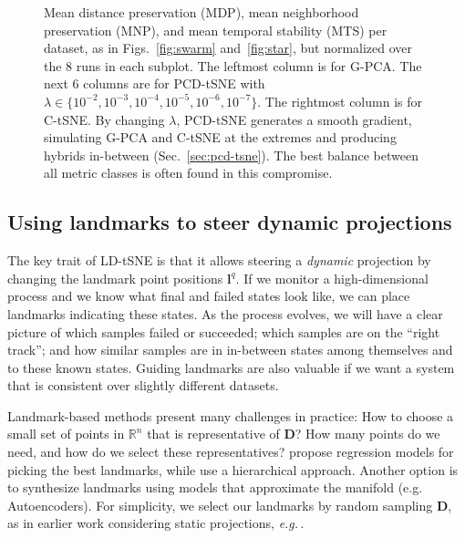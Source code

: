 \begin{figure}[htb!]
 \caption{
Mean distance preservation (MDP), mean neighborhood preservation (MNP), and mean temporal stability (MTS) per dataset, as in Figs.~\ref{fig:swarm} and~\ref{fig:star}, but normalized over the 8 runs in each subplot.
  The leftmost column is for G-PCA. The next 6 columns are for PCD-tSNE with $\lambda \in \{10^{-2}, 10^{-3}, 10^{-4}, 10^{-5}, 10^{-6}, 10^{-7}\}$. The rightmost column is for C-tSNE.
  By changing $\lambda$, PCD-tSNE generates a smooth gradient, simulating G-PCA and C-tSNE at the extremes and producing hybrids in-between (Sec.~\ref{sec:pcd-tsne}). The best balance between all metric classes is often found in this compromise.}
  \vspace{-0.5cm}
 \label{fig:lambda}
\end{figure}



\subsection{Using landmarks to steer dynamic projections} 
\label{sec:landmark-placement}
%
The key trait of LD-tSNE is that it allows steering a \emph{dynamic} projection by changing the landmark point positions $\mathbf{l}^q$. If we monitor a high-dimensional process and we know what final and failed states look like, we can place landmarks indicating these states. As the process evolves, we will have a clear picture of which samples failed or succeeded; which samples are on the ``right track''; and how similar samples are in in-between states among themselves and to these known states. Guiding landmarks are also valuable if we want a system that is consistent over slightly different datasets. 

Landmark-based methods present many challenges in practice: How to choose a small set of points in $\mathbb{R}^n$ that is representative of $\mathbf{D}$? How many points do we need, and how do we select these representatives? \cite{DeSilva2005} propose regression models for picking the best landmarks, while \cite{Pezzotti2016} use a hierarchical approach. Another option is to synthesize landmarks using models that approximate the manifold (e.g. Autoencoders). For simplicity, we select our landmarks by random sampling $\mathbf{D}$, as in earlier work considering static projections, \emph{e.g.}\,\citep{Joia2011,Pekalska1999}.

